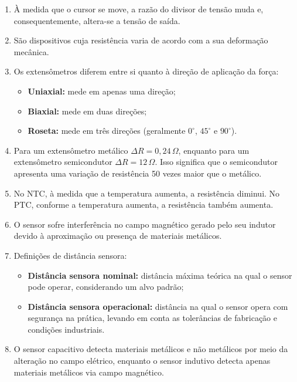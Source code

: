 \begin{enumerate}[label=\textbf{\arabic*)}, leftmargin=*]

    \item À medida que o cursor se move, a razão do divisor de tensão muda e, consequentemente, altera-se a tensão de saída.

    \item São dispositivos cuja resistência varia de acordo com a sua deformação mecânica.

    \item Os extensômetros diferem entre si quanto à direção de aplicação da força:
        \begin{itemize}
            \item \textbf{Uniaxial:} mede em apenas uma direção;
            \item \textbf{Biaxial:} mede em duas direções;
            \item \textbf{Roseta:} mede em três direções (geralmente $0^\circ$, $45^\circ$ e $90^\circ$).
        \end{itemize}

    \item Para um extensômetro metálico $\Delta R = 0{,}24\,\Omega$, enquanto para um extensômetro semicondutor $\Delta R = 12\,\Omega$. Isso significa que o semicondutor apresenta uma variação de resistência 50 vezes maior que o metálico.

    \item No NTC, à medida que a temperatura aumenta, a resistência diminui. No PTC, conforme a temperatura aumenta, a resistência também aumenta.

    \item O sensor sofre interferência no campo magnético gerado pelo seu indutor devido à aproximação ou presença de materiais metálicos.

    \item Definições de distância sensora:
        \begin{itemize}
            \item \textbf{Distância sensora nominal:} distância máxima teórica na qual o sensor pode operar, considerando um alvo padrão;
            \item \textbf{Distância sensora operacional:} distância na qual o sensor opera com segurança na prática, levando em conta as tolerâncias de fabricação e condições industriais.
        \end{itemize}

    \item O sensor capacitivo detecta materiais metálicos e não metálicos por meio da alteração no campo elétrico, enquanto o sensor indutivo detecta apenas materiais metálicos via campo magnético.


\end{enumerate}
